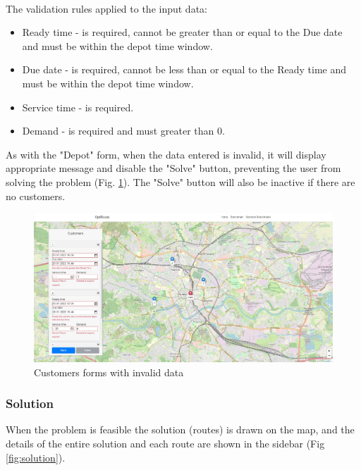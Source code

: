 \documentclass[a4paper,twoside,12pt]{book}
\begin{document}
\paragraph{}

The validation rules applied to the input data:
\begin{itemize}
    \item Ready time - is required, cannot be greater than or equal to the Due date and must be within the depot time window.
    \item Due date - is required, cannot be less than or equal to the Ready time and must be within the depot time window.
    \item Service time - is required.
    \item Demand - is required and must greater than 0.
\end{itemize}

As with the "Depot" form, when the data entered is invalid, it will display appropriate message and disable the "Solve" button, preventing the user from solving the problem (Fig. \ref{fig:invalidCustomers}). The "Solve" button will also be inactive if there are no customers.

\begin{figure}[H]
\centering
\includegraphics[scale=0.3]{images/invalidCustomers.jpg}
\caption{Customers forms with invalid data}
\label{fig:invalidCustomers}
\end{figure}

\subsubsection{Solution}
When the problem is feasible the solution (routes) is drawn on the map, and the details of the entire solution and each route are shown in the sidebar (Fig \ref{fig:solution}).

\paragraph{}
\end{document}
